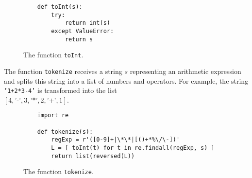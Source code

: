 \begin{figure}[!ht]
\centering
\begin{verbatim}
    def toInt(s):
        try:
            return int(s)   
        except ValueError:
            return s                
\end{verbatim}
\vspace*{-0.3cm}
\caption{The function \texttt{toInt}.}
\label{fig:toInt.py}
\end{figure}

The function \texttt{tokenize} receives a string $s$ representing an arithmetic expression and splits this
string into a list of numbers and operators. For example, the string \texttt{'1+2*3-4'} is transformed into the list
\\[0.2cm]
\hspace*{1.3cm}
$[4, \texttt{'-'}, 3, \texttt{'*'}, 2, \texttt{'+'}, 1]$.
\\[0.2cm]


\begin{figure}[!ht]
\centering
\begin{verbatim}
    import re

    def tokenize(s):
        regExp = r'([0-9]+|\*\*|[()+*%\/\-])'
        L = [ toInt(t) for t in re.findall(regExp, s) ]
        return list(reversed(L))                 
\end{verbatim}
\vspace*{-0.3cm}
\caption{The function \texttt{tokenize}.}
\label{fig:tokenize.py}
\end{figure}

